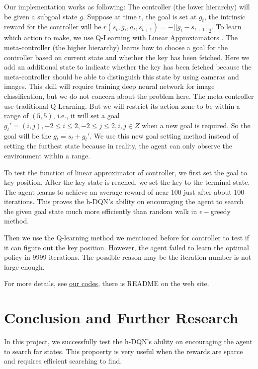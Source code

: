 \documentclass{article}
\begin{document}
\begin{spacing}{1.1}
    Our implementation works as following: The controller (the lower hierarchy) will be given a subgoal state $g$. Suppose at time t, the goal is set at $g_t$, the intrinsic reward for the controller will be $r(s_t, g_t, a_t, s_{t+1}) = -||g_t - s_{t+1}||_2$. To learn which action to make, we use Q-Learning with Linear Approxiamators \cite{lecture}. The meta-controller (the higher hierarchy) learns how to choose a goal for the controller based on current state and whether the key has been fetched. Here we add an additional state to indicate whether the key has been fetched because the meta-controller should be able to distinguish this state by using cameras and images. This skill will require training deep neural network for image classification, but we do not concern about the problem here. The meta-controller use traditional Q-Learning. But we will restrict its action zone to be within a range of $(5, 5)$, i.e., it will set a goal $g_t' = (i, j), -2\leq i\leq 2, -2\leq j\leq 2, i, j\in Z$ when a new goal is required. So the goal will be the $g_t = s_t + g_t'$. We use this new goal setting method instead of setting the furthest state because in reality, the agent can only observe the environment within a range.

    To test the function of linear approximator of controller, we first set the goal to key position. After the key state is reached, we set the key to the terminal state. The agent learns to achieve an average reward of near 100 just after about 100 iterations. This proves the h-DQN's ability on encouraging the agent to search the given goal state much more efficiently than random walk in $\epsilon-$greedy method.

    Then we use the Q-learning method we mentioned before for controller to test if it can figure out the key position. However, the agent failed to learn the optimal policy in 9999 iterations. The possible reason may be the iteration number is not large enough.

    For more details, see \href{https://github.com/faebdc/AI-Project}{our codes}, there is README on the web site.

    \section{Conclusion and Further Research}
    In this project, we successfully test the h-DQN's ability on encouraging the agent to search far states. This propoerty is very useful when the rewards are sparce and requires efficient searching to find.


\end{spacing}
\end{document}
